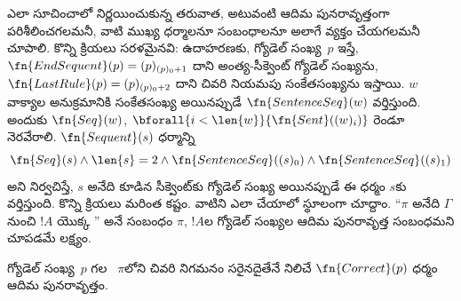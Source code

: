 \documentclass[../../../include/open-logic-section]{subfiles}
\begin{document}
\begin{explain}
 ఎలా సూచించాలో నిర్ణయించుకున్న తరువాత,
అటువంటి  ఆదిమ పునరావృత్తంగా
పరిశీలించగలమనీ, వాటి ముఖ్య ధర్మాలనూ సంబంధాలనూ అలాగే వ్యక్తం చేయగలమనీ చూపాలి.
కొన్ని క్రియలు సరళమైనవి: ఉదాహరణకు,
 గ్యోడెల్ సంఖ్య~$p$ ఇస్తే,
$\fn{EndSequent}(p)=(p)_{(p)_0+1}$ దాని అంత్య-సీక్వెంట్ గ్యోడెల్ సంఖ్యను,
$\fn{LastRule}(p)=(p)_{(p)_0+2}$ దాని చివరి నియమపు సంకేతసంఖ్యను ఇస్తాయి.
$w$ వాక్యాల అనుక్రమానికి సంకేతసంఖ్య అయినప్పుడే
$\fn{SentenceSeq}(w)$ వర్తిస్తుంది. అందుకు $\fn{Seq}(w)$,
$\bforall{i<\len{w}}{\fn{Sent}((w)_i)}$ రెండూ నెరవేరాలి.
$\fn{Sequent}(s)$ ధర్మాన్ని
\[
  \fn{Seq}(s)\land\len{s}=2\land
  \fn{SentenceSeq}((s)_0)\land\fn{SentenceSeq}((s)_1)
\]
అని నిర్వచిస్తే, $s$ అనేది  కూడిన సీక్వెంట్‌కు
గ్యోడెల్ సంఖ్య అయినప్పుడే ఈ ధర్మం $s$కు వర్తిస్తుంది. కొన్ని క్రియలు
మరింత కష్టం. వాటిని ఎలా చేయాలో స్థూలంగా చూద్దాం. ``$\pi$ అనేది $\Gamma$ నుంచి
$!A$ యొక్క '' అనే సంబంధం
$\pi$, $!A$ల గ్యోడెల్ సంఖ్యల ఆదిమ పునరావృత్త సంబంధమని చూపడమే లక్ష్యం.
\end{explain}

\begin{prop}
  గ్యోడెల్ సంఖ్య~$p$ గల ~$\pi$లోని
  చివరి నిగమనం సరైనదైతేనే నిలిచే $\fn{Correct}(p)$ ధర్మం ఆదిమ పునరావృత్తం.
\end{prop}
\end{document}

